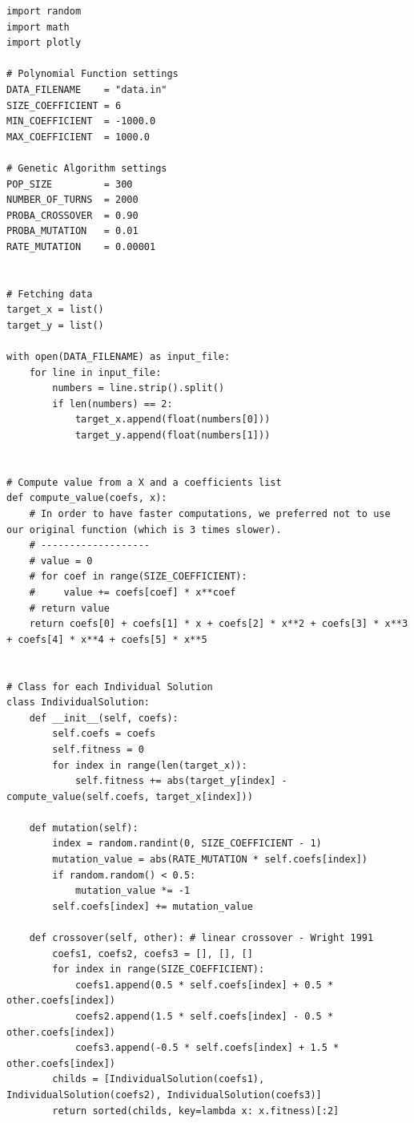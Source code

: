 \documentclass[12pt]{article}
\begin{document}
\begin{lstlisting}[frame=single,caption=Compute of the fitness value]
import random
import math
import plotly

# Polynomial Function settings
DATA_FILENAME    = "data.in"
SIZE_COEFFICIENT = 6
MIN_COEFFICIENT  = -1000.0
MAX_COEFFICIENT  = 1000.0

# Genetic Algorithm settings
POP_SIZE         = 300
NUMBER_OF_TURNS  = 2000
PROBA_CROSSOVER  = 0.90
PROBA_MUTATION   = 0.01
RATE_MUTATION    = 0.00001


# Fetching data
target_x = list()
target_y = list()

with open(DATA_FILENAME) as input_file:
    for line in input_file:
        numbers = line.strip().split()
        if len(numbers) == 2:
            target_x.append(float(numbers[0]))
            target_y.append(float(numbers[1]))


# Compute value from a X and a coefficients list
def compute_value(coefs, x):
    # In order to have faster computations, we preferred not to use our original function (which is 3 times slower).
    # -------------------
    # value = 0
    # for coef in range(SIZE_COEFFICIENT):
    #     value += coefs[coef] * x**coef
    # return value
    return coefs[0] + coefs[1] * x + coefs[2] * x**2 + coefs[3] * x**3 + coefs[4] * x**4 + coefs[5] * x**5


# Class for each Individual Solution
class IndividualSolution:
    def __init__(self, coefs):
        self.coefs = coefs
        self.fitness = 0
        for index in range(len(target_x)):
            self.fitness += abs(target_y[index] - compute_value(self.coefs, target_x[index]))

    def mutation(self):
        index = random.randint(0, SIZE_COEFFICIENT - 1)
        mutation_value = abs(RATE_MUTATION * self.coefs[index])
        if random.random() < 0.5:
            mutation_value *= -1
        self.coefs[index] += mutation_value

    def crossover(self, other): # linear crossover - Wright 1991
        coefs1, coefs2, coefs3 = [], [], []
        for index in range(SIZE_COEFFICIENT):
            coefs1.append(0.5 * self.coefs[index] + 0.5 * other.coefs[index])
            coefs2.append(1.5 * self.coefs[index] - 0.5 * other.coefs[index])
            coefs3.append(-0.5 * self.coefs[index] + 1.5 * other.coefs[index])
        childs = [IndividualSolution(coefs1), IndividualSolution(coefs2), IndividualSolution(coefs3)]
        return sorted(childs, key=lambda x: x.fitness)[:2]



\end{lstlisting}
\end{document}
